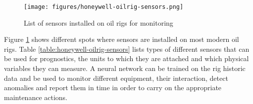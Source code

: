 \begin{figure}[p!]
	\centering
	\texttt{[image: figures/honeywell-oilrig-sensors.png]}
	\caption{List of sensors installed on oil rigs for monitoring}%
	\label{fig:honeywell-oilrig-sensors}
\end{figure}

Figure \ref{fig:honeywell-oilrig-sensors} shows different spots where sensors are installed on most modern oil rigs. Table \ref{table:honeywell-oilrig-sensors} lists types of different sensors that can be used for prognostics, the units to which they are attached and which physical variables they can measure. A neural network can be trained on the rig historic data and be used to monitor different equipment, their interaction, detect anomalies and report them in time in order to carry on the appropriate maintenance actions.

